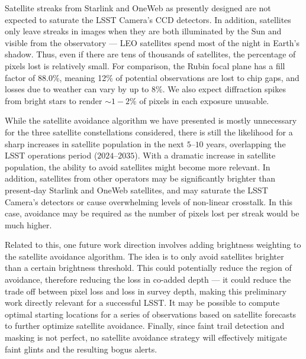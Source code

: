 \documentclass[twocolumn]{aastex631}
\begin{document}
Satellite streaks from Starlink and OneWeb as presently designed are not expected to saturate the LSST Camera's CCD detectors. In addition, satellites only leave streaks in images when they are both illuminated by the Sun and visible from the observatory --- LEO satellites spend most of the night in Earth's shadow.
Thus, even if there are tens of thousands of satellites, the percentage of pixels lost is relatively small. For comparison, the Rubin focal plane has a fill factor of 88.0\%, meaning 12\% of potential observations are lost to chip gaps, and losses due to weather can vary by up to 8\%. We also expect diffraction spikes from bright stars to render $\sim 1-2$\% of pixels in each exposure unusable.

While the satellite avoidance algorithm we have presented is mostly unnecessary for the three satellite constellations considered, there is still the likelihood for a sharp increases in satellite population in the next $5–10$ years, overlapping the LSST operations period ($2024–2035$). With a dramatic increase in satellite population, the ability to avoid satellites might become more relevant. In addition, satellites from other operators may be significantly brighter than present-day Starlink and OneWeb satellites, and may saturate the LSST Camera’s detectors or cause overwhelming levels of non-linear crosstalk. In this case, avoidance may be required as the number of pixels lost per streak would be much higher.

Related to this, one future work direction involves adding brightness weighting to the satellite avoidance algorithm. The idea is to only avoid satellites brighter than a certain brightness threshold. This could potentially reduce the region of avoidance, therefore reducing the loss in co-added depth --- it could reduce the trade off between pixel loss and loss in survey depth, making this preliminary work directly relevant for a successful LSST. It may be possible to compute optimal starting locations for a series of observations based on satellite forecasts to further optimize satellite avoidance. Finally, since faint trail detection and masking is not perfect, no satellite avoidance strategy will effectively mitigate faint glints and the resulting bogus alerts.


\end{document}

